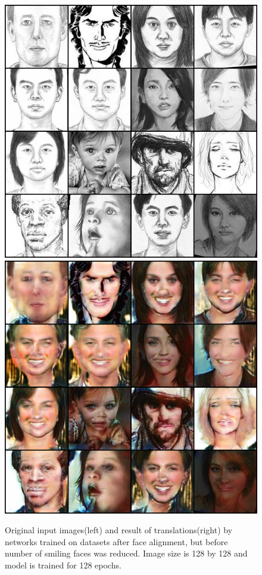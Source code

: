 \begin{figure}[ht]
    \begin{center}
    \includegraphics[scale=0.32]{Graphics/smiling_input.png}
    \includegraphics[scale=0.32]{Graphics/smiling_output.png}
    \end{center}
    \caption{Original input images(left) and result of translations(right) by networks trained on datasets after face alignment, but before number of smiling faces was reduced. Image size is 128 by 128 and model is trained for 128 epochs.}\label{FIG:smile}
\end{figure}


